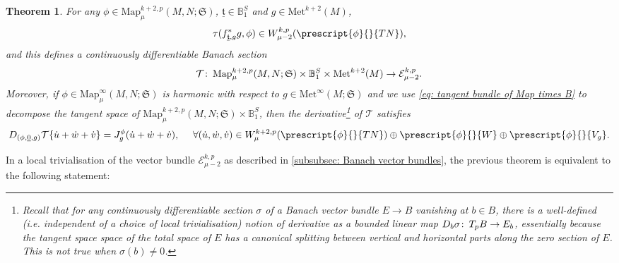 \documentclass{article}
\numberwithin{equation}{section}        %
\theoremstyle{bfnote}
\newtheorem{thm}{Theorem}[section]          %
\theoremstyle{definition}
\theoremstyle{bfremark}
\newcommand{\col}{\colon \thinspace}        %
\newcommand{\Ball}{\mathbb{B}}              %
\newcommand{\Map}{\mathrm{Map}}             %
\newcommand{\Met}{\mathrm{Met}}             %
\begin{document}
\begin{thm}     \label{thm: Variations of the tension}
    For any $\phi \in \Map^{k+2,p}_\mu(M,N;\mathfrak{S})$, $\underline{\mathfrak{t}} \in \Ball_1^S$ and $g \in \Met^{k+2}(M)$,
    \begin{equation*}
        \tau(f_{\underline{\mathfrak{t}},g}^*g,\phi) \in W^{k,p}_{\mu-2}(\prescript{\phi}{}{TN}),
    \end{equation*}
    and this defines a continuously differentiable Banach section
    \begin{equation*}
        \mathcal{T} \col \Map^{k+2,p}_{\mu}(M,N;\mathfrak{S}) \times \Ball_1^S \times \Met^{k+2}(M) \to \mathcal{E}^{k,p}_{\mu-2} .
    \end{equation*}
    Moreover, if $\phi \in \Map^\infty_\mu(M,N;\mathfrak{S})$ is harmonic with respect to $g \in \Met^\infty(M;\mathfrak{S})$ and we use \eqref{eq: tangent bundle of Map times B} to decompose the tangent space of $\Map^{k+2,p}_\mu(M,N;\mathfrak{S}) \times \Ball_1^S$, then the derivative\footnote{Recall that for any continuously differentiable section $\sigma$ of a Banach vector bundle $E \to B$ vanishing at $b \in B$, there is a well-defined (i.e. independent of a choice of local trivialisation) notion of derivative as a bounded linear map $D_b \sigma \col T_p B \to E_b$, essentially because the tangent space space of the total space of $E$ has a canonical splitting between vertical and horizontal parts along the zero section of $E$. This is not true when $\sigma(b)\neq 0$.} of $\mathcal{T}$ satisfies
    \begin{equation*}
        D_{(\phi,\underline{0},g)}\mathcal{T}\{\dot u + \dot w + \dot v\} = J^\phi_g(\dot u + \dot w + \dot v), ~~~~ \forall (\dot u, \dot w, \dot v) \in W^{k+2,p}_\mu(\prescript{\phi}{}{TN}) \oplus \prescript{\phi}{}{W} \oplus \prescript{\phi}{}{V_g} .
    \end{equation*}
\end{thm}

In a local trivialisation of the vector bundle $\mathcal{E}^{k,p}_{\mu-2}$ as described in \cref{subsubsec: Banach vector bundles}, the previous theorem is equivalent to the following statement:
\end{document}
